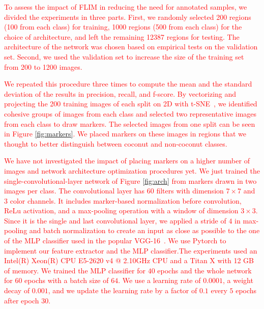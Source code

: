 \documentclass[journal, twoside]{IEEEtran}
\begin{document}
\textcolor{red}{
To assess the impact of FLIM in reducing the need for annotated samples, we
divided the experiments in three parts. First, we randomly selected 200 regions (100 from each class) for training, 1000 regions (500 from each class) for the choice of architecture, and left the remaining 12387 regions for testing. The architecture of the network was chosen based on empirical tests on the validation set. Second, we used the validation set to increase the size of the training set from 200 to 1200 images. 

\textcolor{red}{We repeated this procedure three times to compute the mean and the standard deviation of the results in precision, recall, and f-score.} By vectorizing and projecting the 200 training images of each split on 2D with t-SNE~\cite{maaten2008visualizing}, \textcolor{red}{we identified cohesive groups of images from each class and selected two representative images from each class to draw markers.}  The selected images from one split can be seen in Figure \ref{fig:markers}. We placed markers on these images in regions that we thought to better distinguish between coconut and non-coconut classes.

\textcolor{red}{We have not investigated the impact of placing markers on a higher number of images and network architecture optimization procedures yet.} We just trained the single-convolutional-layer network of Figure \ref{fig:arch} from markers drawn in two images per class. The convolutional layer has $60$ filters with dimension $7 \times 7$ and 3 color channels. It includes marker-based normalization before convolution, ReLu activation, and a max-pooling operation with a window of dimension $3 \times 3$. Since it is the single and last convolutional layer, we applied a stride of $4$ in max-pooling and batch normalization to create an input as close as possible to the one of the \textcolor{red}{MLP} classifier used in the popular VGG-16~\cite{simonyan2014very}. \textcolor{red}{We use Pytorch to implement our feature extractor and the MLP classifier.The experiments used an Intel(R) Xeon(R) CPU E5-2620 v4 @ 2.10GHz CPU and a Titan X with 12 GB of memory.} We trained the MLP classifier for $40$ epochs and the whole network for $60$ epochs with a batch size of $64$. We use a learning rate of $0.0001$, a weight decay of $0.001$, and we update the learning rate by a factor of $0.1$ every $5$ epochs after epoch 30.

}
\end{document}
